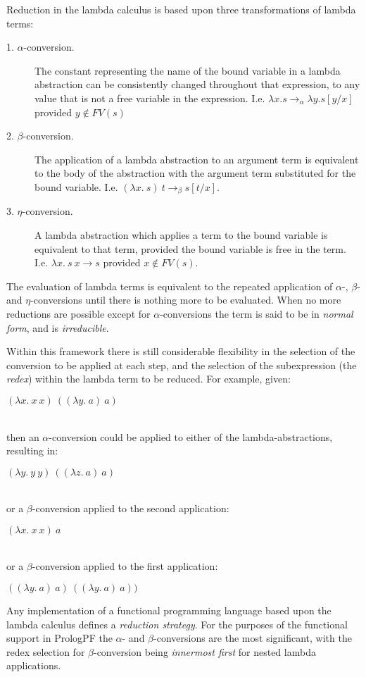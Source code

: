 Reduction in the lambda calculus is based upon three transformations of lambda terms:
\begin{description}
\item[1. $\alpha$-conversion.]{The constant representing the name of the bound variable
  in a lambda abstraction can be consistently changed throughout that expression, to any
  value that is not a free variable in the expression.  I.e. $\lambda x. s \rightarrow_\alpha
  \lambda y.s[y/x]$ provided $y \not \in FV(s)$}
\item[2. $\beta$-conversion.]{The application of a lambda abstraction to an argument
  term is equivalent to the body of the abstraction with the argument term 
  substituted for the bound variable.  I.e. $(\lambda x.\ s)\ t \rightarrow_\beta
  s[t/x]$.}
\item[3. $\eta$-conversion.]{A lambda abstraction which applies a term to the bound
  variable is equivalent to that term,
  provided the bound variable is free in the term.  I.e. $\lambda x.\ s\ x \rightarrow s$
  provided $x \not \in FV(s)$.}
\end{description}

The evaluation of lambda terms is equivalent to the repeated application of 
$\alpha$-, $\beta$- and $\eta$-conversions until there is nothing more to be 
evaluated.  When no more reductions are possible except for $\alpha$-conversions
the term is said to be in \textit{normal form}, and is \textit{irreducible}.

Within this framework there is still considerable flexibility in the selection of
the conversion to be applied at each step, and the selection of the subexpression
(the \textit{redex}) within the lambda term to be reduced.  For example, given:\\
\centerline{$(\lambda x.\ x\ x)\ ((\lambda y.\ a)\ a)$}\\
then an $\alpha$-conversion could be applied to either of the lambda-abstractions,
resulting in:\\
\centerline{$(\lambda y.\ y\ y)\ ((\lambda z.\ a)\ a)$}\\
or a $\beta$-conversion applied to the second application:\\
\centerline{$(\lambda x.\ x\ x)\ a$}\\
or a $\beta$-conversion applied to the first application:\\
\centerline{$((\lambda y.\ a)\ a)\ ((\lambda y.\ a)\ a))$}

Any implementation of a functional programming language based upon the lambda
calculus defines a \textit{reduction strategy}.  For the purposes of the
functional support in PrologPF the $\alpha$- and $\beta$-conversions are the
most significant, with the redex selection
for $\beta$-conversion being \textit{innermost first} for
nested lambda applications.

